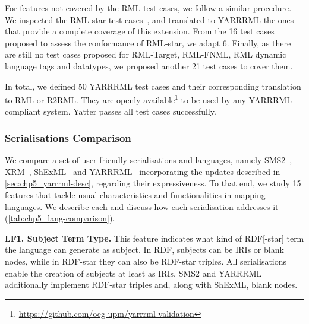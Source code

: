 For features not covered by the RML test cases, we follow a similar procedure. 
We inspected the RML-star test cases~\citep{david_chaves_2022_6518802}, and translated to YARRRML the ones that provide a complete coverage of this extension. 
From the 16 test cases proposed to assess the conformance of RML-star, we adapt 6. 
Finally, as there are still no test cases proposed for RML-Target, RML-FNML, RML dynamic language tags and datatypes, we 
proposed another 21 test cases to cover them.

In total, we defined 50 YARRRML test cases and their corresponding translation to RML or R2RML. 
They are openly available\footnote{\label{foot:yarrrml-resources}\url{https://github.com/oeg-upm/yarrrml-validation}} to be used by any YARRRML-compliant system.
Yatter passes all test cases successfully. %


\subsubsection{Serialisations Comparison} %





We compare a set of user-friendly serialisations and languages, namely SMS2~\citep{sms2}, XRM~\citep{xrm}, ShExML~\citep{Garcia-Gonzalez2020shexml} and YARRRML~\citep{Heyvaert2018yarrrml} incorporating the updates described in \cref{sec:chp5_yarrrml-desc}, regarding their expressiveness. 
To that end, we study 15 features that tackle usual characteristics and functionalities in mapping languages.
We describe each and discuss how each serialisation addresses it (\cref{tab:chp5_lang-comparison}). 

\textbf{LF1. Subject Term Type.} 
This feature indicates what kind of RDF[-star] term the language can generate as subject.
In RDF, subjects can be IRIs or blank nodes, while in RDF-star they can also be RDF-star triples.
All serialisations enable the creation of subjects at least as IRIs, SMS2 and YARRRML additionally implement RDF-star triples and, along with ShExML, blank nodes.


